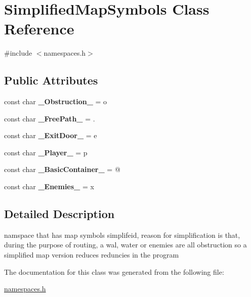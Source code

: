 \hypertarget{class_simplified_map_symbols}{}\section{Simplified\+Map\+Symbols Class Reference}
\label{class_simplified_map_symbols}


{\ttfamily \#include $<$namespaces.\+h$>$}

\subsection*{Public Attributes}
\begin{DoxyCompactItemize}
\item 
\hypertarget{class_simplified_map_symbols_a0375f8c694211215144c286732e9130b}{}\label{class_simplified_map_symbols_a0375f8c694211215144c286732e9130b} 
const char {\bfseries \+\_\+\+Obstruction\+\_\+} = \textquotesingle{}o\textquotesingle{}
\item 
\hypertarget{class_simplified_map_symbols_a5bf54ef0bcc8ba8d7533d4905d918648}{}\label{class_simplified_map_symbols_a5bf54ef0bcc8ba8d7533d4905d918648} 
const char {\bfseries \+\_\+\+Free\+Path\+\_\+} = \textquotesingle{}.\textquotesingle{}
\item 
\hypertarget{class_simplified_map_symbols_a9486d70c0c2d428f9aac18156c69abde}{}\label{class_simplified_map_symbols_a9486d70c0c2d428f9aac18156c69abde} 
const char {\bfseries \+\_\+\+Exit\+Door\+\_\+} = \textquotesingle{}e\textquotesingle{}
\item 
\hypertarget{class_simplified_map_symbols_a3eb7298652a2218d634180dc846723be}{}\label{class_simplified_map_symbols_a3eb7298652a2218d634180dc846723be} 
const char {\bfseries \+\_\+\+Player\+\_\+} = \textquotesingle{}p\textquotesingle{}
\item 
\hypertarget{class_simplified_map_symbols_a9712578714bec8ede61f9a34d3ef6926}{}\label{class_simplified_map_symbols_a9712578714bec8ede61f9a34d3ef6926} 
const char {\bfseries \+\_\+\+Basic\+Container\+\_\+} = \textquotesingle{}@\textquotesingle{}
\item 
\hypertarget{class_simplified_map_symbols_a04ea6cefb75a9cd095825a556bdc8ea5}{}\label{class_simplified_map_symbols_a04ea6cefb75a9cd095825a556bdc8ea5} 
const char {\bfseries \+\_\+\+Enemies\+\_\+} = \textquotesingle{}x\textquotesingle{}
\end{DoxyCompactItemize}


\subsection{Detailed Description}
namspace that has map symbols simplifeid, reason for simplification is that, during the purpose of routing, a wal, water or enemies are all obstruction so a simplified map version reduces reduncies in the program 

The documentation for this class was generated from the following file\+:\begin{DoxyCompactItemize}
\item 
\hyperlink{namespaces_8h}{namespaces.\+h}\end{DoxyCompactItemize}

